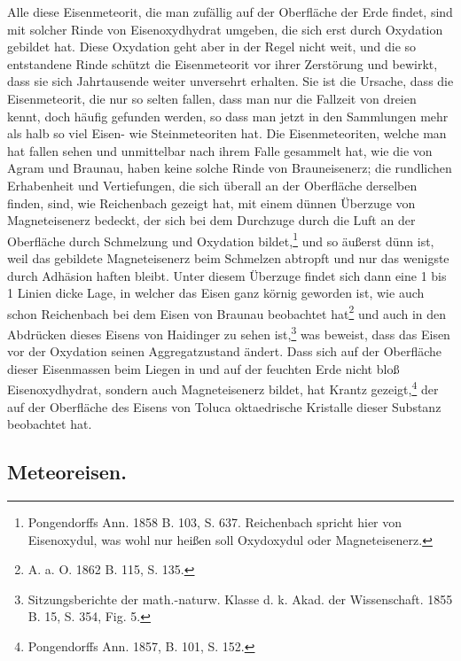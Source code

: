 \documentclass[a4paper, 11pt, oneside]{article}
\begin{document}
Alle diese Eisenmeteorit, die man zufällig auf der Oberfläche der Erde findet, sind mit solcher Rinde von Eisenoxydhydrat umgeben, die sich erst durch Oxydation gebildet hat. Diese Oxydation geht aber in der Regel nicht weit, und die so entstandene Rinde schützt die Eisenmeteorit vor ihrer Zerstörung und bewirkt, dass sie sich Jahrtausende weiter unversehrt erhalten. Sie ist die Ursache, dass die Eisenmeteorit, die nur so selten fallen, dass man nur die Fallzeit von dreien kennt, doch häufig gefunden werden, so dass man jetzt in den Sammlungen mehr als halb so viel Eisen- wie Steinmeteoriten hat. Die Eisenmeteoriten, welche man hat fallen sehen und unmittelbar nach ihrem Falle gesammelt hat, wie die von Agram und Braunau, haben keine solche Rinde von Brauneisenerz; die rundlichen Erhabenheit und Vertiefungen, die sich überall an der Oberfläche derselben finden, sind, wie Reichenbach gezeigt hat, mit einem dünnen Überzuge von Magneteisenerz bedeckt, der sich bei dem Durchzuge durch die Luft an der Oberfläche durch Schmelzung und Oxydation bildet,\footnote{Pongendorffs Ann. 1858 B. 103, S. 637. Reichenbach spricht hier von Eisenoxydul, was wohl nur heißen soll Oxydoxydul oder Magneteisenerz.} und so äußerst dünn ist, weil das gebildete Magneteisenerz beim Schmelzen abtropft und nur das wenigste durch Adhäsion haften bleibt. Unter diesem Überzuge findet sich dann eine 1 bis 1 Linien dicke Lage, in welcher das Eisen ganz körnig geworden ist, wie auch schon Reichenbach bei dem Eisen von Braunau beobachtet hat\footnote{A. a. O. 1862 B. 115, S. 135.} und auch in den Abdrücken dieses Eisens von Haidinger zu sehen ist,\footnote{Sitzungsberichte der math.-naturw. Klasse d. k. Akad. der Wissenschaft. 1855 B. 15, S. 354, Fig. 5.} was beweist, dass das Eisen vor der Oxydation seinen Aggregatzustand ändert. Dass sich auf der Oberfläche dieser Eisenmassen beim Liegen in und auf der feuchten Erde nicht bloß Eisenoxydhydrat, sondern auch Magneteisenerz bildet, hat Krantz gezeigt,\footnote{Pongendorffs Ann. 1857, B. 101, S. 152.} der auf der Oberfläche des Eisens von Toluca oktaedrische Kristalle dieser Substanz beobachtet hat.
\subsection{Meteoreisen.}
\end{document}
